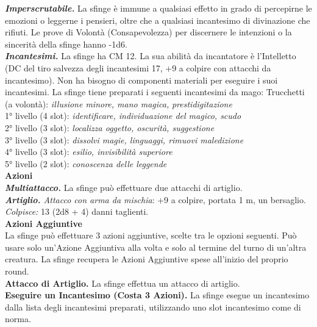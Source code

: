 \begin{multicols}{2}
\emph{\textbf{Imperscrutabile.}} La sfinge è immune a qualsiasi effetto in grado di percepirne le emozioni o leggerne i pensieri, oltre che a qualsiasi incantesimo di divinazione che rifiuti. Le prove di Volontà (Consapevolezza) per discernere le intenzioni o la sincerità della sfinge
hanno -1d6.\\

\emph{\textbf{Incantesimi.}} La sfinge ha CM 12. La sua abilità da incantatore è l'Intelletto (DC del tiro salvezza degli incantesimi 17, +9 a colpire con attacchi da incantesimo). Non ha bisogno di componenti materiali per eseguire i suoi incantesimi. La sfinge tiene preparati i seguenti incantesimi da mago: Trucchetti (a volontà): \emph{illusione minore, mano magica,} \emph{prestidigitazione}\\
1° livello (4 slot): \emph{identificare, individuazione del magico, scudo}\\
2° livello (3 slot): \emph{localizza oggetto, oscurità, suggestione}\\
3° livello (3 slot): \emph{dissolvi magie, linguaggi, rimuovi maledizione}\\
4° livello (3 slot): \emph{esilio, invisibilità superiore}\\
5° livello (2 slot): \emph{conoscenza delle leggende}\\
\smallskip\textbf{Azioni}\\
\emph{\textbf{Multiattacco.}} La sfinge può effettuare due attacchi di artiglio.\\
\emph{\textbf{Artiglio.} Attacco con arma da mischia}: +9 a colpire, portata 1 m, un bersaglio.\\
\emph{Colpisce:} 13 (2d8 + 4) danni taglienti.\\
\textbf{Azioni Aggiuntive}\\
La sfinge può effettuare 3 azioni aggiuntive, scelte tra le opzioni seguenti. Può usare solo un'Azione Aggiuntiva alla volta e solo al termine del turno di un'altra creatura. La sfinge recupera le Azioni Aggiuntive spese all'inizio del proprio round. \\
\textbf{Attacco di Artiglio.} La sfinge effettua un attacco di artiglio.\\
\textbf{Eseguire un Incantesimo (Costa 3 Azioni).} La sfinge esegue un incantesimo dalla lista degli incantesimi preparati, utilizzando uno slot incantesimo come di norma.\\


\end{multicols}
